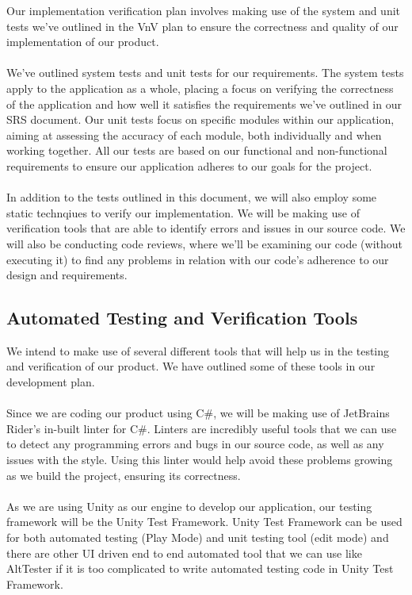 \documentclass[12pt, titlepage]{article}
\begin{document}
      Our implementation verification plan involves making use of the system and unit tests we've outlined in the VnV plan to ensure the correctness and quality of our implementation of our product.\\\\
      We've outlined system tests and unit tests for our requirements. The system tests apply to the application as a whole, placing a focus on verifying the correctness of the application and how well it satisfies the requirements we've outlined in our SRS document. Our unit tests focus on specific modules within our application, aiming at assessing the accuracy of each module, both individually and when working together. All our tests are based on our functional and non-functional requirements to ensure our application adheres to our goals for the project.\\\\
      In addition to the tests outlined in this document, we will also employ some static technqiues to verify our implementation. We will be making use of verification tools that are able to identify errors and issues in our source code. We will also be conducting code reviews, where we'll be examining our code (without executing it) to find any problems in relation with our code's adherence to our design and requirements.

\subsection{Automated Testing and Verification Tools}

      We intend to make use of several different tools that will help us in the testing and verification of our product. We have outlined some of these tools in our development plan.\\\\
      Since we are coding our product using C\#, we will be making use of JetBrains Rider's in-built linter for C\#. Linters are incredibly useful tools that we can use to detect any programming errors and bugs in our source code, as well as any issues with the style. Using this linter would help avoid these problems growing as we build the project, ensuring its correctness.\\\\
      As we are using Unity as our engine to develop our application, our testing framework will be the Unity Test Framework. Unity Test Framework can be used for both automated testing (Play Mode) and unit testing tool (edit mode) and there are other UI driven end to end automated tool that we can use like AltTester if it is too complicated to write automated testing code in Unity Test Framework.
\end{document}
